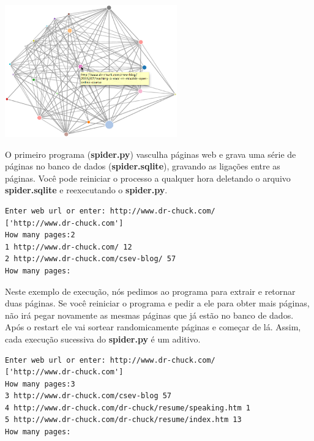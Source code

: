 \beforefig
\centerline{\includegraphics[height=2.25in]{figs2/pagerank.eps}}
\afterfig

O primeiro programa ({\bf spider.py}) vasculha páginas web e grava
uma série de páginas no banco de dados ({\bf spider.sqlite}), gravando
as ligações entre as páginas. Você pode reiniciar o processo a qualquer
hora deletando o arquivo {\bf spider.sqlite} e reexecutando o {\bf spider.py}.

\beforeverb
\begin{verbatim}
Enter web url or enter: http://www.dr-chuck.com/
['http://www.dr-chuck.com']
How many pages:2
1 http://www.dr-chuck.com/ 12
2 http://www.dr-chuck.com/csev-blog/ 57
How many pages:
\end{verbatim}
\afterverb
%

Neste exemplo de execução, nós pedimos ao programa para extrair e 
retornar duas páginas. Se você reiniciar o programa e pedir a ele para
obter mais páginas, não irá pegar novamente as mesmas páginas que já
estão no banco de dados. Após o restart ele vai sortear randomicamente
páginas e começar de lá. Assim, cada execução sucessiva do {\bf spider.py}
é um aditivo.

\beforeverb
\begin{verbatim}
Enter web url or enter: http://www.dr-chuck.com/
['http://www.dr-chuck.com']
How many pages:3
3 http://www.dr-chuck.com/csev-blog 57
4 http://www.dr-chuck.com/dr-chuck/resume/speaking.htm 1
5 http://www.dr-chuck.com/dr-chuck/resume/index.htm 13
How many pages:
\end{verbatim}
\afterverb
%


